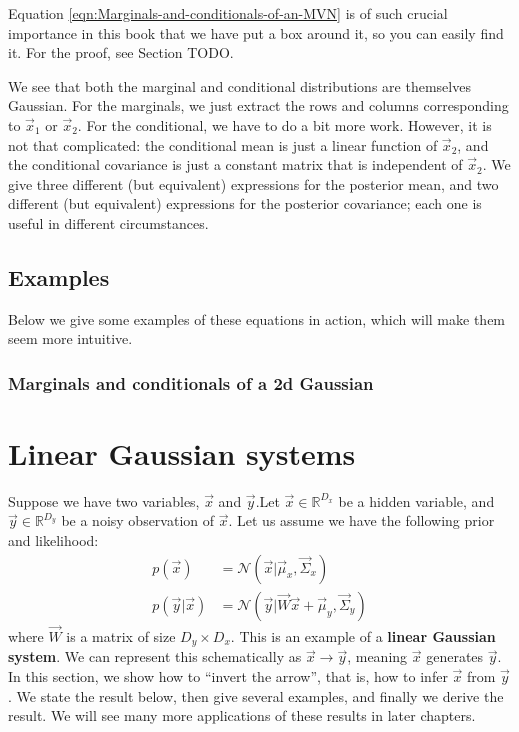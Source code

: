 Equation \ref{eqn:Marginals-and-conditionals-of-an-MVN} is of such crucial importance in this book that we have put a box around it, so you can easily find it. For the proof, see Section TODO.

We see that both the marginal and conditional distributions are themselves Gaussian. For the marginals, we just extract the rows and columns corresponding to $\vec{x}_1$ or $\vec{x}_2$. For the conditional, we have to do a bit more work. However, it is not that complicated: the conditional mean is just a linear function of $\vec{x}_2$, and the conditional covariance is just a constant matrix that is independent of $\vec{x}_2$. We give three different (but equivalent) expressions for the posterior mean, and two different (but equivalent) expressions for the posterior covariance; each one is useful in different circumstances.


\subsection{Examples}
Below we give some examples of these equations in action, which will make them seem more intuitive.


\subsubsection{Marginals and conditionals of a 2d Gaussian}


\section{Linear Gaussian systems}
Suppose we have two variables, $\vec{x}$ and $\vec{y}$.Let $\vec{x} \in \mathbb{R}^{D_x}$ be a hidden variable, and $\vec{y} \in \mathbb{R}^{D_y}$ be a noisy observation of $\vec{x}$. Let us assume we have the following prior and likelihood:
\begin{equation}\label{eqn:Linear-Gaussian-system}
  \boxed{\begin{split}
    p(\vec{x})&=\mathcal{N}(\vec{x}|\vec{\mu}_x,\vec{\Sigma}_x) \\
	p(\vec{y}|\vec{x})&=\mathcal{N}(\vec{y}|\vec{W}\vec{x}+\vec{\mu}_y,\vec{\Sigma}_y)
  \end{split}}
\end{equation}
where $\vec{W}$ is a matrix of size $D_y \times D_x$. This is an example of a \textbf{linear Gaussian system}. We can represent this schematically as $\vec{x} \rightarrow \vec{y}$, meaning $\vec{x}$ generates $\vec{y}$. In this section, we show how to “invert the arrow”, that is, how to infer $\vec{x}$ from $\vec{y}$. We state the result below, then give several examples, and finally we derive the result. We will see many more applications of these results in later chapters.


